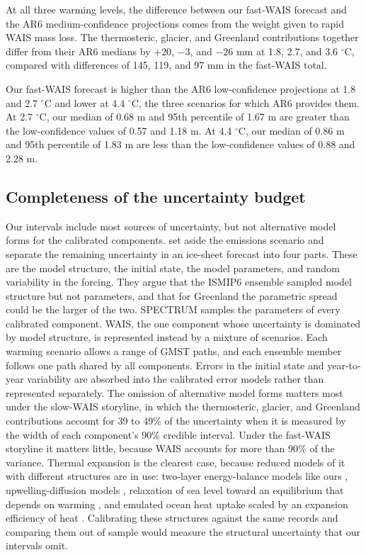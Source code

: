 \documentclass[draft,linenumbers]{agujournal2025}
\begin{document}
At all three warming levels, the difference between our fast-WAIS forecast and the AR6 medium-confidence projections comes from the weight given to rapid WAIS mass loss. The thermosteric, glacier, and Greenland contributions together differ from their AR6 medians by $+20$, $-3$, and $-26$ mm at 1.8, 2.7, and 3.6 $^\circ$C, compared with differences of 145, 119, and 97 mm in the fast-WAIS total.

Our fast-WAIS forecast is higher than the AR6 low-confidence projections at 1.8 and 2.7 $^\circ$C and lower at 4.4 $^\circ$C, the three scenarios for which AR6 provides them. At 2.7 $^\circ$C, our median of 0.68 m and 95th percentile of 1.67 m are greater than the low-confidence values of 0.57 and 1.18 m. At 4.4 $^\circ$C, our median of 0.86 m and 95th percentile of 1.83 m are less than the low-confidence values of 0.88 and 2.28 m.

\subsection{Completeness of the uncertainty budget}

Our intervals include most sources of uncertainty, but not alternative model forms for the calibrated components. \citet{Aschwanden2021} set aside the emissions scenario and separate the remaining uncertainty in an ice-sheet forecast into four parts. These are the model structure, the initial state, the model parameters, and random variability in the forcing. They argue that the ISMIP6 ensemble sampled model structure but not parameters, and that for Greenland the parametric spread could be the larger of the two. SPECTRUM samples the parameters of every calibrated component. WAIS, the one component whose uncertainty is dominated by model structure, is represented instead by a mixture of scenarios. Each warming scenario allows a range of GMST paths, and each ensemble member follows one path shared by all components. Errors in the initial state and year-to-year variability are absorbed into the calibrated error models rather than represented separately. The omission of alternative model forms matters most under the slow-WAIS storyline, in which the thermosteric, glacier, and Greenland contributions account for 39 to 49\% of the uncertainty when it is measured by the width of each component's 90\% credible interval. Under the fast-WAIS storyline it matters little, because WAIS accounts for more than 90\% of the variance. Thermal expansion is the clearest case, because reduced models of it with different structures are in use: two-layer energy-balance models like ours \citep{Held2010,Geoffroy2013}, upwelling-diffusion models \citep{Nauels2017}, relaxation of sea level toward an equilibrium that depends on warming \citep{Mengel2016}, and emulated ocean heat uptake scaled by an expansion efficiency of heat \citep{Fox-Kemper2021}. Calibrating these structures against the same records and comparing them out of sample would measure the structural uncertainty that our intervals omit. 
\end{document}
